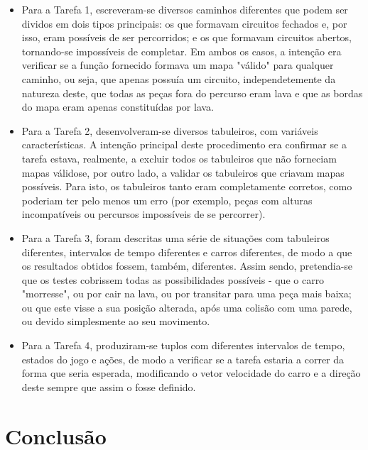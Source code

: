 \documentclass[a4paper]{report} %
\begin{document}
\begin{itemize}
    
    \item Para a Tarefa 1, escreveram-se diversos caminhos diferentes que podem ser dividos em dois tipos principais: os que formavam circuitos fechados e, por isso, eram possíveis de ser percorridos; e os que formavam circuitos abertos, tornando-se impossíveis de completar. Em ambos os casos, a intenção era verificar se a função fornecido formava um mapa "válido" para qualquer caminho, ou seja, que apenas possuía um circuito, independetemente da natureza deste, que todas as peças fora do percurso eram lava e que as bordas do mapa eram apenas constituídas por lava.
    
    \item Para a Tarefa 2, desenvolveram-se diversos tabuleiros, com variáveis características. A intenção principal deste procedimento era confirmar se a tarefa estava, realmente, a excluir todos os tabuleiros que não forneciam mapas válidose, por outro lado, a validar os tabuleiros que criavam mapas possíveis. Para isto, os tabuleiros tanto eram completamente corretos, como poderiam ter pelo menos um erro (por exemplo, peças com alturas incompatíveis ou percursos impossíveis de se percorrer).
    
    \item Para a Tarefa 3, foram descritas uma série de situações com tabuleiros diferentes, intervalos de tempo diferentes e carros diferentes, de modo a que os resultados obtidos fossem, também, diferentes. Assim sendo, pretendia-se que os testes cobrissem todas as possibilidades possíveis - que o carro "morresse", ou por cair na lava, ou por transitar para uma peça mais baixa; ou que este visse a sua posição alterada, após uma colisão com uma parede, ou devido simplesmente ao seu movimento.
    
    \newpage
    
    \item Para a Tarefa 4, produziram-se tuplos com diferentes intervalos de tempo, estados do jogo e ações, de modo a verificar se a tarefa estaria a correr da forma que seria esperada, modificando o vetor velocidade do carro e a direção deste sempre que assim o fosse definido.
    
\end{itemize}





\chapter{Conclusão}
\end{document}
